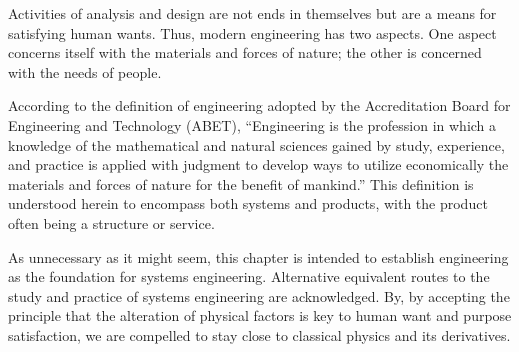 Activities of analysis and design are not ends in themselves but are a means for satisfying human wants. Thus, modern engineering has two aspects. One aspect concerns itself with the materials and forces of nature; the other is concerned with the needs of people.

According to the definition of engineering adopted by the Accreditation Board for Engineering and Technology (ABET), ``Engineering is the profession in which a knowledge of the mathematical and natural sciences gained by study, experience, and practice is applied with judgment to develop ways to utilize economically the materials and forces of nature for the benefit of mankind.'' This definition is understood herein to encompass both systems and products, with the product often being a structure or service.

As unnecessary as it might seem, this chapter is intended to establish engineering as the foundation for systems engineering. Alternative equivalent routes to the study and practice of systems engineering are acknowledged. By, by accepting the principle that the alteration of physical factors is key to human want and purpose satisfaction, we are compelled to stay close to classical physics and its derivatives.